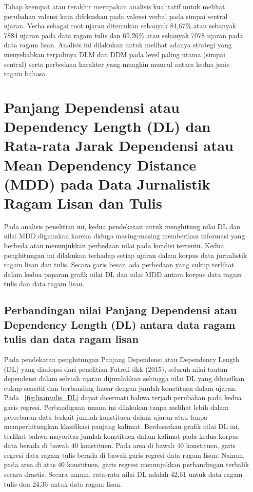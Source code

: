 Tahap keempat atau terakhir merupakan analisis kualitatif untuk melihat perubahan valensi kata difokuskan pada valensi verbal pada simpai sentral ujaran. Verba sebagai root ujaran ditemukan sebanyak 84,67\% atau sebanyak 7884 ujaran pada data ragam tulis dan 69,26\% atau sebanyak 7078 ujaran pada data ragam lisan. Analisis ini dilakukan untuk melihat adanya strategi yang menyebabkan terjadinya DLM dan DDM pada level paling utama (simpai sentral) serta perbedaan karakter yang mungkin muncul antara kedua jenis ragam bahasa.

\section{Panjang Dependensi atau Dependency Length (DL) dan Rata-rata Jarak Dependensi atau Mean Dependency Distance (MDD) pada Data Jurnalistik Ragam Lisan dan Tulis}
Pada analisis penelitian ini, kedua pendekatan untuk menghitung nilai DL dan nilai MDD digunakan karena diduga masing-masing memberikan informasi yang berbeda atau menunjukkan perbedaan nilai pada kondisi tertentu. Kedua penghitungan ini dilakukan terhadap setiap ujaran dalam korpus data jurnalistik ragam lisan dan tulis. Secara garis besar, ada perbedaan yang cukup terlihat dalam kedua paparan grafik nilai DL dan nilai MDD antara korpus data ragam tulis dan data ragam lisan.

\subsection{Perbandingan nilai Panjang Dependensi atau Dependency Length (DL) antara data ragam tulis dan data ragam lisan}
Pada pendekatan penghitungan Panjang Dependensi atau Dependency Length (DL) yang diadopsi dari penelitian Futrell dkk (2015), seluruh nilai tautan dependensi dalam sebuah ujaran dijumlahkan sehingga nilai DL yang dihasilkan cukup sensitif dan berbanding linear dengan jumlah konstituen dalam ujaran. Pada \pic~\ref{fig:lisantulis_DL} dapat dicermati bahwa terjadi perubahan pada kedua garis regresi. Perbandignan umum ini dilakukan tanpa melihat lebih dalam persebaran data terkait jumlah konstituen dalam ujaran atau tanpa memperhitungkan klasifikasi panjang kalimat. Berdasarkan grafik nilai DL ini, terlihat bahwa mayoritas jumlah konstituen dalam kalimat pada kedua korpus data berada di bawah 40 konstituen. Pada area di bawah 40 konstituen, garis regresi data ragam tulis berada di bawah garis regresi data ragam lisan. Namun, pada area di atas 40 konstituen, garis regresi menunjukkan perbandingan terbalik secara drastis. Secara umum, rata-rata nilai DL adalah 42,61 untuk data ragam tulis dan 24,36 untuk data ragam lisan. 

